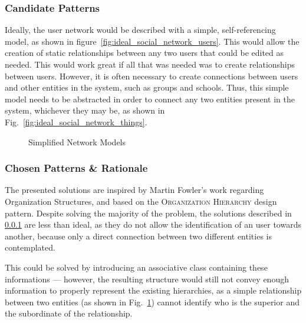 \subsubsection{Candidate Patterns}\label{sec:fa_social_network_candidate_patterns}

Ideally, the user network would be described with a simple, self-referencing model, as shown in figure~\ref{fig:ideal_social_network_users}. This would allow the creation of static relationships between any two users that could be edited as needed. This would work great if all that was needed was to create relationships between users. However, it is often necessary to create connections between users and other entities in the system, such as groups and schools. Thus, this simple model needs to be abstracted in order to connect any two entities present in the system, whichever they may be, as shown in Fig.~\ref{fig:ideal_social_network_things}.

\begin{figure}[H]
  \centering
  \hspace{20mm}
  \caption{Simplified Network Models}
  \label{fig:simplified_network_models}
\end{figure}

\subsubsection{Chosen Patterns \& Rationale}\label{sec:fa_social_network_chosen_patterns_rationale}

The presented solutions are inspired by Martin Fowler's work regarding Organization Structures, and based on the \textsc{Organization Hierarchy} design pattern. Despite solving the majority of the problem, the solutions described in \ref{sec:fa_social_network_candidate_patterns} are less than ideal, as they do not allow the identification of an user towards another, because only a direct connection between two different entities is contemplated.

This could be solved by introducing an associative class containing these informations --- however, the resulting structure would still not convey enough information to properly represent the existing hierarchies, as a simple relationship between two entities (as shown in Fig.~\ref{fig:simplified_network_models}) cannot identify who is the superior and the subordinate of the relationship.

